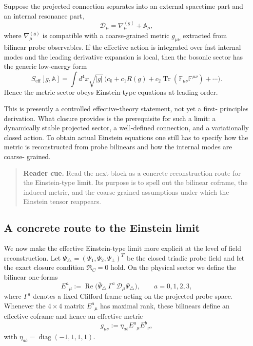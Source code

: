 \begin{proposition}
\label{prop:einstein-effective-limit}
Suppose the projected connection separates into an external spacetime part
and an internal resonance part,
\[
  \mathcal D_\mu = \nabla_\mu^{(g)} + \mathbb A_\mu,
\]
where $\nabla_\mu^{(g)}$ is compatible with a coarse-grained metric
$g_{\mu\nu}$ extracted from bilinear probe observables.
If the effective action is integrated over fast internal modes and the
leading derivative expansion is local, then the bosonic sector has the
generic low-energy form
\[
  S_{\mathrm{eff}}[g,\mathbb A]
  = \int d^4x\sqrt{|g|}\,
    \bigl(c_0 + c_1 R(g) + c_2\operatorname{Tr}(\mathbb F_{\mu\nu}\mathbb F^{\mu\nu}) + \cdots\bigr).
\]
Hence the metric sector obeys Einstein-type equations at leading order.
\end{proposition}

\begin{remark}
This is presently a controlled effective-theory statement, not yet a first-
principles derivation.
What closure provides is the prerequisite for such a limit: a dynamically
stable projected sector, a well-defined connection, and a variationally
closed action.
To obtain actual Einstein equations one still has to specify how the metric
is reconstructed from probe bilinears and how the internal modes are coarse-
grained.
\end{remark}

\begin{quote}\small
\noindent\textbf{Reader cue.} Read the next block as a concrete reconstruction route for the Einstein-type limit. Its purpose is to spell out the bilinear coframe, the induced metric, and the coarse-grained assumptions under which the Einstein tensor reappears.
\end{quote}

\subsection*{A concrete route to the Einstein limit}

We now make the effective Einstein-type limit more explicit at the level of
field reconstruction. Let $\Psi_\triangle=(\Psi_1,\Psi_2,\Psi_\perp)^T$ be the
closed triadic probe field and let the exact closure condition
$\mathfrak R_C=0$ hold. On the physical sector we define the bilinear one-forms
\[
  E^a{}_{\mu}
  := \operatorname{Re}\bigl(\bar\Psi_\triangle \,\Gamma^a \, \mathcal D_\mu
  \Psi_\triangle\bigr),
  \qquad a=0,1,2,3,
\]
where $\Gamma^a$ denotes a fixed Clifford frame acting on the projected probe
space. Whenever the $4\times 4$ matrix $E^a{}_{\mu}$ has maximal rank, these
bilinears define an effective coframe and hence an effective metric
\[
  g_{\mu\nu}
  := \eta_{ab} E^a{}_{\mu} E^b{}_{\nu},
\]
with $\eta_{ab}=\operatorname{diag}(-1,1,1,1)$.

